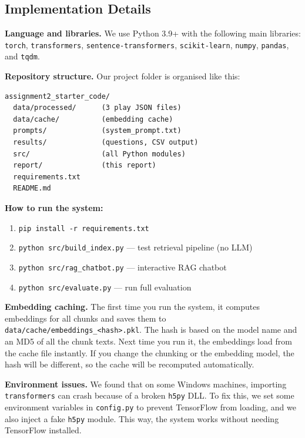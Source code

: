 \documentclass[10pt,conference]{IEEEtran}
\begin{document}
\subsection{Implementation Details}

\textbf{Language and libraries.} We use Python 3.9+ with the following main libraries: \texttt{torch}, \texttt{transformers}, \texttt{sentence-transformers}, \texttt{scikit-learn}, \texttt{numpy}, \texttt{pandas}, and \texttt{tqdm}.

\textbf{Repository structure.} Our project folder is organised like this:

\begin{lstlisting}[language={},frame=none]
assignment2_starter_code/
  data/processed/      (3 play JSON files)
  data/cache/          (embedding cache)
  prompts/             (system_prompt.txt)
  results/             (questions, CSV output)
  src/                 (all Python modules)
  report/              (this report)
  requirements.txt
  README.md
\end{lstlisting}

\textbf{How to run the system:}
\begin{enumerate}
    \item \texttt{pip install -r requirements.txt}
    \item \texttt{python src/build\_index.py} --- test retrieval pipeline (no LLM)
    \item \texttt{python src/rag\_chatbot.py} --- interactive RAG chatbot
    \item \texttt{python src/evaluate.py} --- run full evaluation
\end{enumerate}

\textbf{Embedding caching.} The first time you run the system, it computes embeddings for all chunks and saves them to \texttt{data/cache/embeddings\_<hash>.pkl}. The hash is based on the model name and an MD5 of all the chunk texts. Next time you run it, the embeddings load from the cache file instantly. If you change the chunking or the embedding model, the hash will be different, so the cache will be recomputed automatically.

\textbf{Environment issues.} We found that on some Windows machines, importing \texttt{transformers} can crash because of a broken \texttt{h5py} DLL. To fix this, we set some environment variables in \texttt{config.py} to prevent TensorFlow from loading, and we also inject a fake \texttt{h5py} module. This way, the system works without needing TensorFlow installed.
\end{document}

